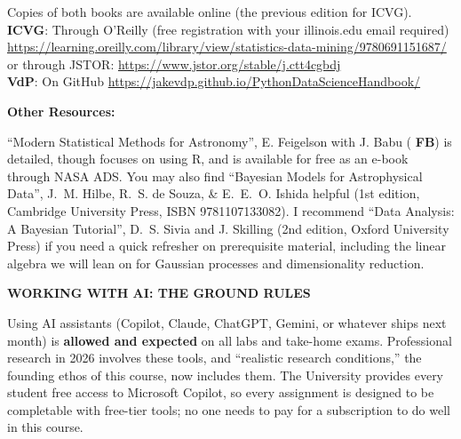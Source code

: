 Copies of both books are available online (the previous edition for ICVG).\\
\smallskip
{\bf ICVG}: Through O'Reilly (free registration with your illinois.edu email required)\\
\url{https://learning.oreilly.com/library/view/statistics-data-mining/9780691151687/}\\
or through JSTOR: \url{https://www.jstor.org/stable/j.ctt4cgbdj}\\
\medskip
{\bf VdP}: On GitHub \url{https://jakevdp.github.io/PythonDataScienceHandbook/}\\
\medskip

{\bf \color{RoyalBlue} Other Resources:}

``Modern Statistical Methods for Astronomy'', E. Feigelson with J. Babu ({\bf
FB}) is detailed, though focuses on using R, and is available for free as an e-book
through NASA ADS. You may also find ``Bayesian Models for Astrophysical Data'',
J.~M. Hilbe, R.~S. de Souza, \& E.~E.~O. Ishida helpful (1st edition, Cambridge
University Press, ISBN 9781107133082). I recommend ``Data Analysis: A Bayesian
Tutorial'', D.~S. Sivia and J. Skilling (2nd edition, Oxford University Press)
if you need a quick refresher on prerequisite material, including the linear
algebra we will lean on for Gaussian processes and dimensionality reduction.

{\large \bf \headerfont \color{RoyalBlue} WORKING WITH AI: THE GROUND RULES}

Using AI assistants (Copilot, Claude, ChatGPT, Gemini, or whatever ships next
month) is {\bf allowed and expected} on all labs and take-home exams. Professional research in 2026 involves these
tools, and ``realistic research conditions,'' the
founding ethos of this course, now includes them. The University provides every student free access
to Microsoft Copilot, so every assignment is designed to be completable with
free-tier tools; no one needs to pay for a subscription to do well in this
course.

